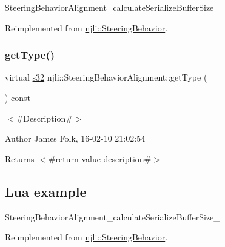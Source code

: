 \begin{DoxyCodeInclude}
\end{DoxyCodeInclude}
Steering\+Behavior\+Alignment\+\_\+calculate\+Serialize\+Buffer\+Size\+\_\+ 

Reimplemented from \mbox{\hyperlink{classnjli_1_1_steering_behavior_abb58d6982dc295fc3e90f096f51b0ef8}{njli\+::\+Steering\+Behavior}}.

\mbox{\label{classnjli_1_1_steering_behavior_alignment_ab5230ab61bf1d66199ad26ec0963887d}} 
\subsubsection{\texorpdfstring{get\+Type()}{getType()}}
{\footnotesize\ttfamily virtual \mbox{\hyperlink{_util_8h_aa62c75d314a0d1f37f79c4b73b2292e2}{s32}} njli\+::\+Steering\+Behavior\+Alignment\+::get\+Type (\begin{DoxyParamCaption}{ }\end{DoxyParamCaption}) const\hspace{0.3cm}{\ttfamily [virtual]}}



$<$\#\+Description\#$>$ 

\begin{DoxyAuthor}{Author}
James Folk, 16-\/02-\/10 21\+:02\+:54
\end{DoxyAuthor}
\begin{DoxyReturn}{Returns}
$<$\#return value description\#$>$
\end{DoxyReturn}
\hypertarget{classnjli_1_1_steering_behavior_wander_ex1}{}\subsection{Lua example}\label{classnjli_1_1_steering_behavior_wander_ex1}

\begin{DoxyCodeInclude}
\end{DoxyCodeInclude}
Steering\+Behavior\+Alignment\+\_\+calculate\+Serialize\+Buffer\+Size\+\_\+ 

Reimplemented from \mbox{\hyperlink{classnjli_1_1_steering_behavior_ae82bca8468d41aff8c22b76fd359fe9b}{njli\+::\+Steering\+Behavior}}.

